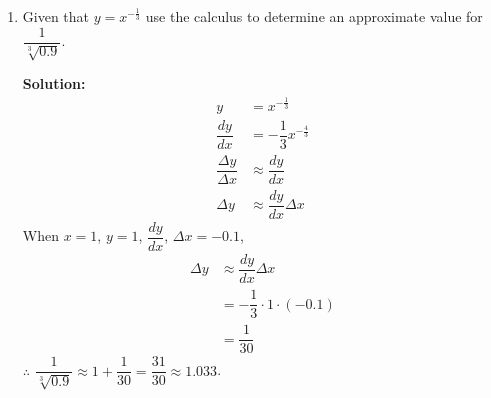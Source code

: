 \documentclass{report}
\newcommand{\sol}{\vspace{0.2cm}\textbf{Solution:}\vspace{0.2cm}}
\begin{document}
\begin{multicols*}{2}
\begin{enumerate}[leftmargin=*]
\begin{enumerate}
                        \newpage
                  \item Express $\frac{4+\sqrt{2}}{2 - \sqrt{2}}$ in the form $p+\sqrt{q}$, where $E$
                        and $q$ are integers.

                        \sol{}
                        \begin{align*}
                            \dfrac{4 + \sqrt{2}}{2 - \sqrt{2}} & = \dfrac{(4 + \sqrt{2})(2 + \sqrt{2})}{(2 - \sqrt{2})(2 + \sqrt{2})} \\
                                                               & = \dfrac{8 + 6\sqrt{2} + 2}{4 - 2}                                   \\
                                                               & = \dfrac{10 + 6\sqrt{2}}{2}                                          \\
                                                               & = 5 + 3\sqrt{2}                                                      \\
                                                               & = 5 + \sqrt{18}
                        \end{align*}
              \end{enumerate}

        \item Given that $y=x^{-\frac{1}{3}}$ use the calculus to determine an approximate
              value for $\dfrac{1}{\sqrt[3]{0.9}}$.

              \sol{}
              \begin{align*}
                  y                          & = x^{-\frac{1}{3}}               \\
                  \dfrac{dy}{dx}             & = -\dfrac{1}{3} x^{-\frac{4}{3}} \\
                  \dfrac{\Delta y}{\Delta x} & \approx \dfrac{dy}{dx}           \\
                  \Delta y                   & \approx \dfrac{dy}{dx} \Delta x
              \end{align*}
              When $x = 1$, $y = 1$, $\dfrac{dy}{dx}$, $\Delta x = -0.1$,
              \begin{align*}
                  \Delta y & \approx \dfrac{dy}{dx} \Delta x      \\
                           & = -\dfrac{1}{3} \cdot 1 \cdot (-0.1) \\
                           & = \dfrac{1}{30}
              \end{align*}
              $\therefore$ $\dfrac{1}{\sqrt[3]{0.9}} \approx 1 + \dfrac{1}{30} = \dfrac{31}{30} \approx 1.033$.


\end{enumerate}
\end{multicols*}
\end{document}
